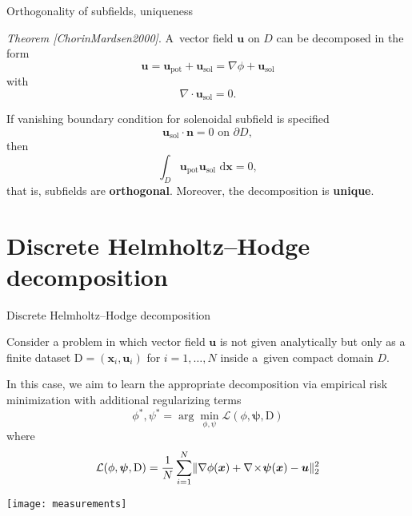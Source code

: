 \documentclass[11pt,aspectratio=169,t]{beamer}
\renewcommand{\vec}[1]{\boldsymbol{#1}}
\DeclarePairedDelimiter\norm{\lVert}{\rVert}
\newcommand{\dd}{\,\textrm{d}}
\newcommand{\upot}{\vec u_{\text{pot}}}
\newcommand{\usol}{\vec u_{\text{sol}}}
\newcommand{\Grad}{\nabla}
\newcommand{\Div}{\nabla \cdot}
\newcommand{\Curl}{\nabla \! \times \!}
\newcommand{\xx}{\vec{x}}
\begin{document}
\begin{frame}{Orthogonality of subfields, uniqueness}

\emph{Theorem [ChorinMardsen2000]}.
A~vector field $\vec u$ on $D$ can be decomposed
in the form
\[
\vec u = \upot + \usol = \Grad \phi + \usol
\]
with $$\Div \usol = 0.$$

If vanishing boundary condition for solenoidal subfield is specified
$$\usol \cdot \vec n = 0 \text{ on } \partial D,$$
then
$$
\int_{D} \upot \usol \, \dd \vec x = 0,
$$
that is, subfields are \textbf{orthogonal}.
Moreover, the decomposition is \textbf{unique}.

\end{frame}


\section{Discrete Helmholtz--Hodge decomposition}

\begin{frame}{Discrete Helmholtz--Hodge decomposition}

\begin{minipage}{0.78\textwidth}
Consider a problem in which vector field $\vec u$ is not given analytically
but only as a finite dataset $\mathrm D = (\xx_{i}, \vec u_{i})$ for $i=1,\dots, N$ inside
a~given compact domain $D$.

In this case, we aim to learn the appropriate decomposition via empirical
risk minimization with additional regularizing terms
\[
\phi^{*}, \psi^{*} =
\arg \min_{\phi, \psi} \mathcal L(\phi, \vec \psi, \mathrm D)
\]
where
\[
\mathcal L(\phi, \vec \psi, \mathrm{D}) =
\frac1N \sum_{i=1}^{N} \norm{\Grad \phi(\xx) + \Curl{\vec \psi(\xx)} - \vec u}^{2}_{2}
\]
\end{minipage}
\hfill
\begin{minipage}{0.20\textwidth}
  \centering
  \texttt{[image: measurements]}
\end{minipage}
\end{frame}
\end{document}
